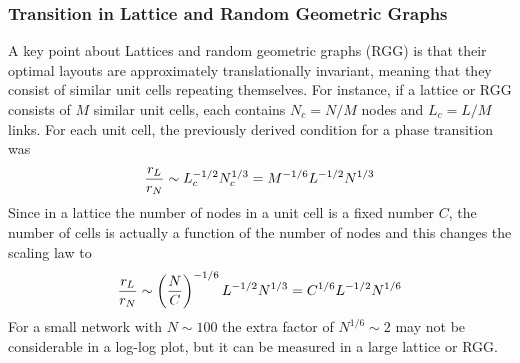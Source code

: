 \documentclass[linenumbers,endfloats,nofootinbib,preprint,floatfix,titlepage,superscriptaddress]{revtex4-1} %
\begin{document}
\subsubsection{Transition in Lattice and Random Geometric Graphs}
A key point about Lattices and random geometric graphs (RGG) is that their optimal layouts are approximately translationally invariant, meaning that they consist of similar unit cells repeating themselves. 
For instance, if a lattice or RGG consists of $M$ similar unit cells, each contains $N_c = N/M$ nodes and $L_c=L/M$ links. 
For each unit cell, the previously derived condition for a phase transition was 
\[{r_L\over r_N} \sim L_c^{-1/2} N_c^{1/3} = M^{-1/6} L^{-1/2} N^{1/3} \]
Since in a lattice the number of nodes in a unit cell is a fixed number $C$, the number of cells is actually a function of the number of nodes and this changes the scaling law to 
\[{r_L\over r_N} \sim \left({N\over C}\right)^{-1/6} L^{-1/2} N^{1/3} = C^{1/6} L^{-1/2} N^{1/6} \]
For a small network with $N\sim 100$ the extra factor of $N^{1/6}\sim 2$ may not be considerable in a log-log plot, but it can be measured in a large lattice or RGG. 
\end{document}
